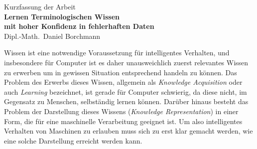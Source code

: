\documentclass[ngerman,fleqn]{scrartcl}
\begin{document}
\medskip
\begin{center}
  \normalsize Kurzfassung der Arbeit\\
  \LARGE\textbf{Lernen Terminologischen Wissen\\ mit hoher Konfidenz in fehlerhaften Daten}\\
  \bigskip%
  \large Dipl.-Math.\ Daniel Borchmann
\end{center}
\bigskip
\bigskip

\noindent
Wissen ist eine notwendige Voraussetzung für intelligentes Verhalten, und insbesondere für
Computer ist es daher unausweichlich zuerst relevantes Wissen zu erwerben um in gewissen
Situation entsprechend handeln zu können.  Das Problem des Erwerbs dieses Wissen,
allgemein als \emph{Knowledge Acquisition} oder auch \emph{Learning} bezeichnet, ist
gerade für Computer schwierig, da diese nicht, im Gegensatz zu Menschen, selbständig
lernen können.  Darüber hinaus besteht das Problem der Darstellung dieses Wissens
(\emph{Knowledge Representation}) in einer Form, die für eine maschinelle Verarbeitung
geeignet ist.  Um also intelligentes Verhalten von Maschinen zu erlauben muss sich zu erst
klar gemacht werden, wie eine solche Darstellung erreicht werden kann.
\end{document}
